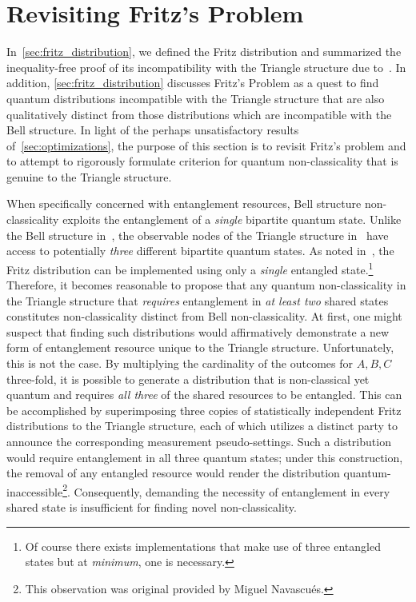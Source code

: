 \documentclass[aps, 10pt, english, twoside, pra, nofootinbib, tightenlines, longbibliography, superscriptaddress]{revtex4-1}
\begin{document}
    \section{Revisiting Fritz's Problem}
    \label{sec:fritz_problem_revisit}

    In~\cref{sec:fritz_distribution}, we defined the Fritz distribution and summarized the inequality-free proof of its     incompatibility with the Triangle structure due to~\cite{Fritz_2012}. In addition, \cref{sec:fritz_distribution} discusses Fritz's Problem as a quest to find quantum distributions incompatible with the Triangle structure that are also qualitatively distinct from those distributions which are incompatible with the Bell structure. In light of the perhaps unsatisfactory results of~\cref{sec:optimizations}, the purpose of this section is to revisit Fritz's problem and to attempt to rigorously formulate criterion for quantum non-classicality that is genuine to the Triangle structure.

    When specifically concerned with entanglement resources, Bell structure non-classicality exploits the entanglement of a \textit{single} bipartite quantum state. Unlike the Bell structure in~, the observable nodes of the Triangle structure in~ have access to potentially \textit{three} different bipartite quantum states. As noted in~\cite{Fritz_2012}, the Fritz distribution can be implemented using only a \textit{single} entangled state.\footnote{Of course there exists implementations that make use of three entangled states but at \textit{minimum}, one is necessary.} Therefore, it becomes reasonable to propose that any quantum non-classicality in the Triangle structure that \textit{requires} entanglement in \textit{at least two} shared states constitutes non-classicality distinct from Bell non-classicality. At first, one might suspect that finding such distributions would affirmatively demonstrate a new form of entanglement resource unique to the Triangle structure. Unfortunately, this is not the case. By multiplying the cardinality of the outcomes for $A, B, C$ three-fold, it is possible to generate a distribution that is non-classical yet quantum and requires \textit{all three} of the shared resources to be entangled. This can be accomplished by superimposing three copies of statistically independent Fritz distributions to the Triangle structure, each of which utilizes a distinct party to announce the corresponding measurement pseudo-settings. Such a distribution would require entanglement in all three quantum states; under this construction, the removal of any entangled resource would render the distribution quantum-inaccessible\footnote{This observation was original provided by Miguel Navascués.}. Consequently, demanding the necessity of entanglement in every shared state is insufficient for finding novel non-classicality.
\end{document}
